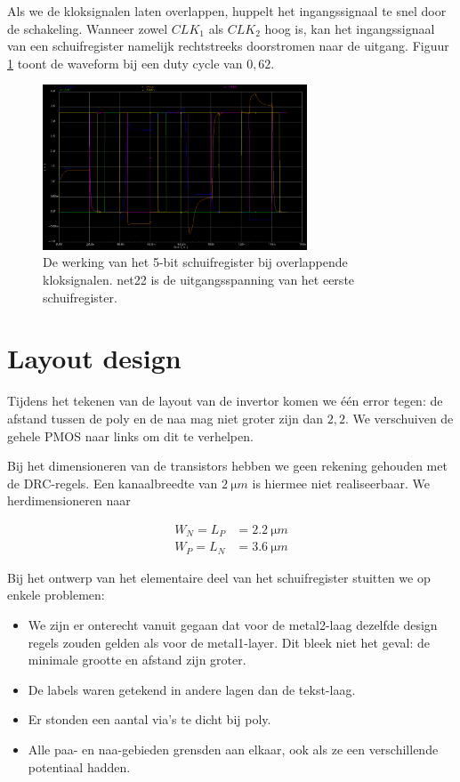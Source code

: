 \documentclass[11pt,a4paper,oneside,dutch]{article}
\begin{document}
Als we de kloksignalen laten overlappen, huppelt het ingangssignaal te snel door de schakeling. Wanneer zowel $CLK_1$ als $CLK_2$ hoog is, kan het ingangssignaal van een schuifregister namelijk rechtstreeks doorstromen naar de uitgang. Figuur \ref{fig:wave_overlap} toont de waveform bij een duty cycle van $0,62$.

\begin{figure}[htp]
	\centering
	\includegraphics[width=0.7\textwidth]{wave_overlap.png}
	\caption{De werking van het 5-bit schuifregister bij overlappende kloksignalen. net22 is de uitgangsspanning van het eerste schuifregister.}
	\label{fig:wave_overlap}
\end{figure}



\section{Layout design}

Tijdens het tekenen van de layout van de invertor komen we één error tegen: de afstand tussen de poly en de naa mag niet groter zijn dan $2,2$. We verschuiven de gehele PMOS naar links om dit te verhelpen.

Bij het dimensioneren van de transistors hebben we geen rekening gehouden met de DRC-regels. Een kanaalbreedte van $\SI{2}{\micro m}$ is hiermee niet realiseerbaar. We herdimensioneren naar

\begin{align*}
W_N = L_P &= \SI{2,2}{\micro m} \\
W_P = L_N &= \SI{3,6}{\micro m}
\end{align*}

Bij het ontwerp van het elementaire deel van het schuifregister stuitten we op enkele problemen:

\begin{itemize}
\item We zijn er onterecht vanuit gegaan dat voor de metal2-laag dezelfde design regels zouden gelden als voor de metal1-layer. Dit bleek niet het geval: de minimale grootte en afstand zijn groter.
\item De labels waren getekend in andere lagen dan de tekst-laag.
\item Er stonden een aantal via's te dicht bij poly.
\item Alle paa- en naa-gebieden grensden aan elkaar, ook als ze een verschillende potentiaal hadden.
\end{itemize}
\end{document}
